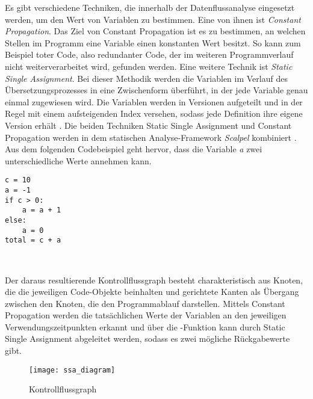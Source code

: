 \documentclass[german,bachelor]{swsLeipzig}
\begin{document}
\noindent Es gibt verschiedene Techniken, die innerhalb der Datenflussanalyse eingesetzt werden, um den Wert von Variablen zu bestimmen.
Eine von ihnen ist \textit{Constant Propagation}.
Das Ziel von Constant Propagation ist es zu bestimmen, an welchen Stellen im Programm eine Variable einen konstanten Wert besitzt.
So kann zum Beispiel toter Code, also redundanter Code, der im weiteren Programmverlauf nicht weiterverarbeitet wird, gefunden werden.
Eine weitere Technik ist \textit{Static Single Assignment}.
Bei dieser Methodik werden die Variablen im Verlauf des Übersetzungsprozesses in eine Zwischenform überführt, in der jede Variable
genau einmal zugewiesen wird.
Die Variablen werden in Versionen aufgeteilt und in der Regel mit einem aufsteigenden Index versehen,
sodass jede Definition ihre eigene Version erhält \cite[]{li2022scalpel}.
Die beiden Techniken Static Single Assignment und Constant Propagation werden in dem statischen Analyse-Framework
\textit{Scalpel} kombiniert \cite[]{li2022scalpel}. \\
\indent Aus dem folgenden Codebeispiel geht hervor, dass die Variable \textit{a} zwei unterschiedliche Werte annehmen kann.\\

\noindent\begin{minipage}{\linewidth}
\begin{lstlisting}[language=iPython, frame=single, basicstyle=\small, caption={Codebeispiel von Scalpel für Datenflussanalyse {\cite[]{li2022scalpel}}},captionpos=b]
c = 10
a = -1
if c > 0:
    a = a + 1
else:
    a = 0
total = c + a

\end{lstlisting}
\end{minipage}
\


\noindent Der daraus resultierende Kontrollflussgraph besteht charakteristisch aus Knoten, die die jeweiligen Code-Objekte beinhalten und gerichtete Kanten als Übergang
zwischen den Knoten, die den Programmablauf darstellen.
Mittels Constant Propagation werden die tatsächlichen Werte der Variablen an den jeweiligen Verwendungszeitpunkten erkannt
und über die \textPhi-Funktion kann durch Static Single Assignment abgeleitet werden, sodass es zwei mögliche Rückgabewerte gibt.

\begin{figure}[h]
 \centering
 \texttt{[image: ssa\_diagram]}
 \caption{Kontrollflussgraph \cite[]{li2022scalpel}}
 \label{fig:scalpel}
\end{figure}
\end{document}

